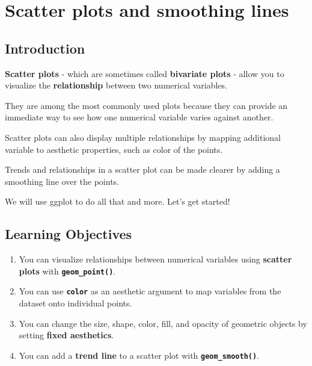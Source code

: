 \documentclass[
  letterpaper,
  DIV=11,
  numbers=noendperiod]{scrreprt}
\providecommand{\tightlist}{%
  \setlength{\itemsep}{0pt}\setlength{\parskip}{0pt}}\usepackage{longtable,booktabs,array}
\begin{document}

\hypertarget{scatter-plots-and-smoothing-lines}{%
\chapter{Scatter plots and smoothing
lines}\label{scatter-plots-and-smoothing-lines}}

\hypertarget{introduction-1}{%
\section{Introduction}\label{introduction-1}}

\textbf{Scatter plots} - which are sometimes called \textbf{bivariate
plots} - allow you to visualize the \textbf{relationship} between two
numerical variables.

They are among the most commonly used plots because they can provide an
immediate way to see how one numerical variable varies against another.

Scatter plots can also display multiple relationships by mapping
additional variable to aesthetic properties, such as color of the
points.

Trends and relationships in a scatter plot can be made clearer by adding
a smoothing line over the points.

We will use ggplot to do all that and more. Let's get started!

\hypertarget{learning-objectives-1}{%
\section{Learning Objectives}\label{learning-objectives-1}}

\begin{enumerate}
\def\labelenumi{\arabic{enumi}.}
\tightlist
\item
  You can visualize relationships between numerical variables using
  \textbf{scatter plots} with \textbf{\texttt{geom\_point()}}.
\item
  You can use \textbf{\texttt{color}} as an aesthetic argument to map
  variables from the dataset onto individual points.
\item
  You can change the size, shape, color, fill, and opacity of geometric
  objects by setting \textbf{fixed aesthetics}.
\item
  You can add a \textbf{trend line} to a scatter plot with
  \textbf{\texttt{geom\_smooth()}}.
\end{enumerate}
\end{document}
